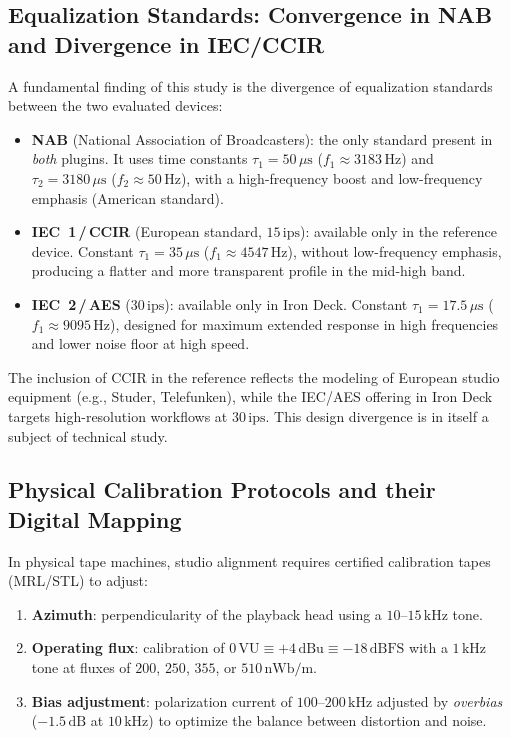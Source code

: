 \documentclass[10pt,conference]{IEEEtran}
\begin{document}
\subsection{Equalization Standards: Convergence in NAB and Divergence in IEC/CCIR}

A fundamental finding of this study is the divergence of equalization standards between
the two evaluated devices:

\begin{itemize}
    \item \textbf{NAB} (National Association of Broadcasters): the only standard present in
    \emph{both} plugins. It uses time constants $\tau_1=50\,\mu\text{s}$ ($f_1\approx 3183\,\text{Hz}$)
    and $\tau_2=3180\,\mu\text{s}$ ($f_2\approx 50\,\text{Hz}$), with a high-frequency boost and low-frequency
    emphasis (American standard).

    \item \textbf{IEC~1\,/\,CCIR} (European standard, $15\,\text{ips}$): available only in the
    reference device. Constant $\tau_1=35\,\mu\text{s}$ ($f_1\approx 4547\,\text{Hz}$), without low-frequency
    emphasis, producing a flatter and more transparent profile in the mid-high band.

    \item \textbf{IEC~2\,/\,AES} ($30\,\text{ips}$): available only in Iron Deck.
    Constant $\tau_1=17.5\,\mu\text{s}$ ($f_1\approx 9095\,\text{Hz}$), designed for
    maximum extended response in high frequencies and lower noise floor at high speed.
\end{itemize}

The inclusion of CCIR in the reference reflects the modeling of European studio equipment
(e.g., Studer, Telefunken), while the IEC/AES offering in Iron Deck targets high-resolution
workflows at $30\,\text{ips}$. This design divergence is in itself a subject of technical study.

\subsection{Physical Calibration Protocols and their Digital Mapping}

In physical tape machines, studio alignment requires certified calibration tapes (MRL/STL) \cite{mrl}
to adjust:
\begin{enumerate}
    \item \textbf{Azimuth}: perpendicularity of the playback head using a $10$–$15\,\text{kHz}$ tone.

    \item \textbf{Operating flux}: calibration of $0\,\text{VU}\equiv+4\,\text{dBu}\equiv -18\,\text{dBFS}$
    with a $1\,\text{kHz}$ tone at fluxes of $200$, $250$, $355$, or $510\,\text{nWb/m}$.

    \item \textbf{Bias adjustment}: polarization current of $100$–$200\,\text{kHz}$ adjusted by \emph{overbias}
    ($-1.5\,\text{dB}$ at $10\,\text{kHz}$) to optimize the balance between distortion and noise.
\end{enumerate}
\end{document}
